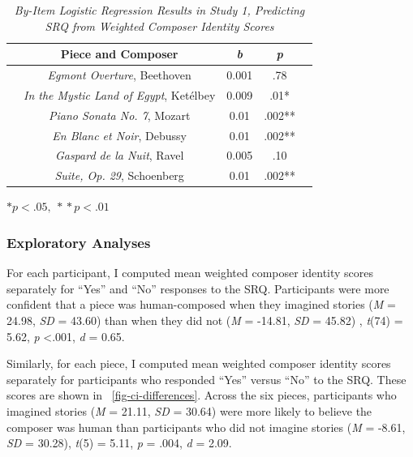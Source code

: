 \documentclass[12pt,twoside]{reedthesis}
\begin{document}
\begin{table}[h]
	\centering
	\caption {\emph{By-Item Logistic Regression Results in Study 1, Predicting SRQ from Weighted Composer Identity Scores}} \label{table-CI-SRQ}
	\bigskip
	\begin{tabular}{c c c c c}
	\toprule
	& Piece and Composer & \emph{b} & \emph{p} &\\
	\hline
	& \emph{Egmont Overture}, Beethoven & 0.001 & .78 &\\
	\hline
	& \emph{In the Mystic Land of Egypt}, Ketélbey & 0.009 & .01* &\\
	\hline
	& \emph{Piano Sonata No. 7}, Mozart & 0.01 & .002** &\\ 
	\hline
	& \emph{En Blanc et Noir}, Debussy & 0.01 & .002** &\\
	\hline
	& \emph{Gaspard de la Nuit}, Ravel & 0.005 & .10 &\\
	\hline
	& \emph{Suite, Op. 29}, Schoenberg & 0.01 & .002** &\\
	\bottomrule
	\end{tabular}\par
	\bigskip
	\small\textit{}$*p < .05,  \:*\!*p < .01$
	\end{table}

\subsubsection{Exploratory Analyses}

For each participant, I computed mean weighted composer identity scores separately for “Yes” and “No” responses to the SRQ. Participants were more confident that a piece was human-composed when they imagined stories (\emph{M} = 24.98, \emph{SD} = 43.60) than when they did not (\emph{M} = -14.81, \emph{SD} = 45.82) , \emph{t}(74) = 5.62, \emph{p} \textless .001, \emph{d} = 0.65. 

Similarly, for each piece, I computed mean weighted composer identity scores separately for participants who responded “Yes” versus “No” to the SRQ. These scores are shown in ~\ref{fig-ci-differences}. Across the six pieces, participants who imagined stories (\emph{M} = 21.11, \emph{SD} = 30.64) were more likely to believe the composer was human than participants who did not imagine stories (\emph{M} = -8.61, \emph{SD} = 30.28), \emph{t}(5) = 5.11, \emph{p} = .004, \emph{d} = 2.09.
\end{document}
